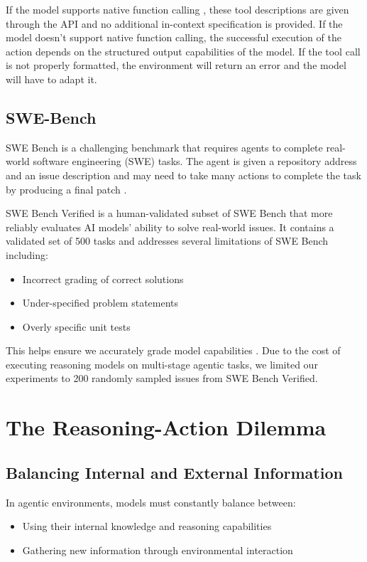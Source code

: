 If the model supports native function calling \cite{openai_function_calling}, these tool descriptions are given through the API and no additional in-context specification is provided. If the model doesn't support native function calling, the successful execution of the action depends on the structured output capabilities of the model. If the tool call is not properly formatted, the environment will return an error and the model will have to adapt it.

\subsection{SWE-Bench}
SWE Bench is a challenging benchmark that requires agents to complete real-world software engineering (SWE) tasks. The agent is given a repository address and an issue description and may need to take many actions to complete the task by producing a final patch \cite{jimenez2024swebenchlanguagemodelsresolve}.

SWE Bench Verified \cite{swebench_verified} is a human-validated subset of SWE Bench \cite{jimenez2024swebenchlanguagemodelsresolve} that more reliably evaluates AI models' ability to solve real-world issues. It contains a validated set of 500 tasks and addresses several limitations of SWE Bench including:
\begin{itemize}
    \item Incorrect grading of correct solutions
    \item Under-specified problem statements
    \item Overly specific unit tests
\end{itemize}

This helps ensure we accurately grade model capabilities \cite{openai_o1_system_card_2024, swebench_verified}. Due to the cost of executing reasoning models \cite{openai_pricing} on multi-stage agentic tasks, we limited our experiments to 200 randomly sampled issues from SWE Bench Verified.

\section{The Reasoning-Action Dilemma}
\label{sec:dilemma}

\subsection{Balancing Internal and External Information}
In agentic environments, models must constantly balance between:
\begin{itemize}
    \item Using their internal knowledge and reasoning capabilities
    \item Gathering new information through environmental interaction
\end{itemize}

